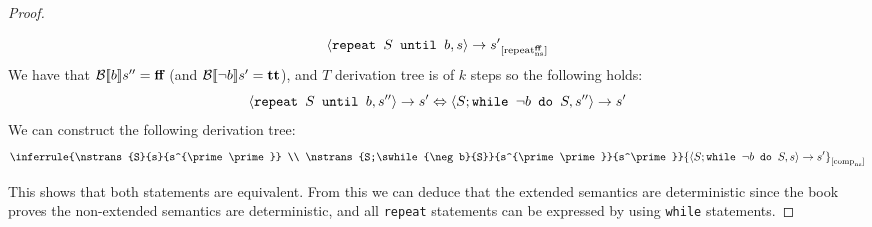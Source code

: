 \begin{proof}
\begin{itemize}
\begin{equation*}
{		}
		{\nstrans{\srepeat{S}{b}}{s}{s^\prime}}_{\nsrule[\false]{repeat}}
	\end{equation*}
	We have that $\beval{b}{s^{\prime\prime}}=\false$ (and $\beval{\neg b}{s^\prime}=\true$), and $T$ derivation tree is of $k$ steps so the following holds:
	\begin{equation*}
		\nstrans{\srepeat{S}{b}}{s^{\prime\prime}}{s^\prime}
		\Leftrightarrow
		\nstrans{S;\swhile{\neg b}{S}}{s^{\prime\prime}}{s^\prime}
	\end{equation*}
	We can construct the following derivation tree:
	\begin{equation*}
	\inferrule
		{\nstrans{S}{s}{s^{\prime\prime}} \\ \nstrans{S;\swhile{\neg b}{S}}{s^{\prime\prime}}{s^\prime}}
		{\nstrans{S;\swhile{\neg b}{S}}{s}{s^\prime}}_{\nsrule{comp}}
	\end{equation*}
\end{itemize}
This shows that both statements are equivalent. From this we can deduce that the extended semantics are deterministic since the book proves the non-extended semantics are deterministic, and all \texttt{repeat} statements can be expressed by using \texttt{while} statements.
\end{proof}